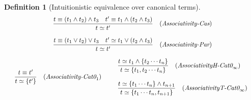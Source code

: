 \documentclass[12pt]{article}
\newtheorem{Definition}{Definition}[section]
\begin{document}
\begin{Definition}[Intuitionistic equivalence over canonical terms]
\begin{displaymath}
\begin{array}{c}
      \begin{array}{rl}
        \dfrac{ t \equiv (t_1 \wedge t_2) \wedge t_3 \quad
          t' \equiv t_1 \wedge (t_2 \wedge t_3) }{
          t \simeq t'
        }  &  (\text{\it Associativity-Cas})
      \end{array}  \\
      \\
      
      \begin{array}{rl}
        \dfrac{ t \equiv (t_1 \vee t_2) \vee t_3 \quad
          t' \simeq t_1 \vee (t_2 \wedge t_3) }{
          t \simeq t'
        }  &  (\text{\it Associativity-Par})
      \end{array}  \\
      \\
      
      \begin{array}{ll}
        \begin{array}{rl}
          \dfrac{ t \equiv t' }{ t \simeq \{t'\} }
          & (\text{\it Associativity-Cat0}_1)
        \end{array}
        & \begin{array}[c]{l}
            \begin{array}{rl}
              \dfrac{
                t \simeq t_1 \wedge \{t_2 \cdots t_n \}
              }{
                t \simeq \{t_1, t_2 \cdots t_n \}
              }  &  (\text{\it AssociativityH-Cat0}_\infty)
            \end{array}  \\
            \\
            \begin{array}{rl}
              \dfrac{
                t \simeq \{t_1 \cdots t_n \} \wedge t_{n+1}
              }{
                t \simeq \{t_1 \cdots t_n, t_{n+1} \}
              }  &  (\text{\it AssociativityT-Cat0}_\infty)
            \end{array}
          \end{array}
      \end{array}  \\
      \\
      

\end{array}
\end{displaymath}
\end{Definition}
\end{document}
